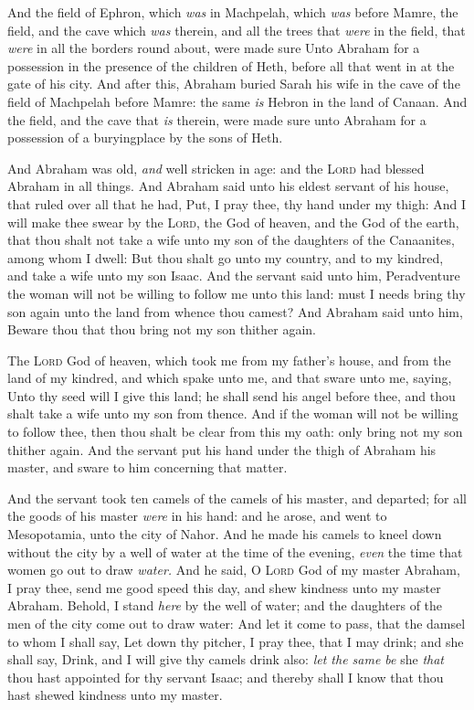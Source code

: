 \documentclass[11pt,letterpaper,oneside]{memoir}
\begin{document}
And the field of Ephron, which \emph{was} in Machpelah, which \emph{was}
before Mamre, the field, and the cave which \emph{was} therein, and all
the trees that \emph{were} in the field, that \emph{were} in all the
borders round about, were made sure Unto Abraham for a possession in the
presence of the children of Heth, before all that went in at the gate of
his city. And after this, Abraham buried Sarah his wife in the cave of
the field of Machpelah before Mamre: the same \emph{is} Hebron in the
land of Canaan. And the field, and the cave that \emph{is} therein, were
made sure unto Abraham for a possession of a buryingplace by the sons of
Heth.

And Abraham was old, \emph{and} well stricken in age: and the
\textsc{Lord} had blessed Abraham in all things. And Abraham said unto his
eldest servant of his house, that ruled over all that he had, Put, I
pray thee, thy hand under my thigh: And I will make thee swear by the
\textsc{Lord}, the God of heaven, and the God of the earth, that thou
shalt not take a wife unto my son of the daughters of the Canaanites,
among whom I dwell: But thou shalt go unto my country, and to my
kindred, and take a wife unto my son Isaac. And the servant said unto
him, Peradventure the woman will not be willing to follow me unto this
land: must I needs bring thy son again unto the land from whence thou
camest? And Abraham said unto him, Beware thou that thou bring not my
son thither again.

The \textsc{Lord} God of heaven, which took me from my father's house, and
from the land of my kindred, and which spake unto me, and that sware
unto me, saying, Unto thy seed will I give this land; he shall send his
angel before thee, and thou shalt take a wife unto my son from thence.
And if the woman will not be willing to follow thee, then thou shalt be
clear from this my oath: only bring not my son thither again. And the
servant put his hand under the thigh of Abraham his master, and sware to
him concerning that matter.

And the servant took ten camels of the camels of his master, and
departed; for all the goods of his master \emph{were} in his hand: and
he arose, and went to Mesopotamia, unto the city of Nahor. And he made
his camels to kneel down without the city by a well of water at the time
of the evening, \emph{even} the time that women go out to draw
\emph{water. }And he said, O \textsc{Lord} God of my master Abraham, I
pray thee, send me good speed this day, and shew kindness unto my master
Abraham. Behold, I stand \emph{here} by the well of water; and the
daughters of the men of the city come out to draw water: And let it come
to pass, that the damsel to whom I shall say, Let down thy pitcher, I
pray thee, that I may drink; and she shall say, Drink, and I will give
thy camels drink also: \emph{let the same be} she \emph{that} thou hast
appointed for thy servant Isaac; and thereby shall I know that thou hast
shewed kindness unto my master.
\end{document}

